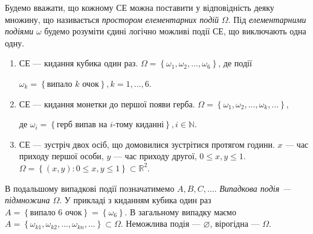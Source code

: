 Будемо вважати, що кожному СЕ можна поставити у відповідність деяку множину, що
називається \emph{простором елементарних подій} $\Omega$. 
Під \emph{елементарними подіями} $\omega$ будемо розуміти єдині
логічно можливі події СЕ, що виключають одна одну.
\begin{example}
    \begin{enumerate}
        \item СЕ --- кидання кубика один раз. 
        $\Omega = \left\{\omega_1, \omega_2, ..., \omega_6\right\}$, 
        де події 

        $\omega_k = \left\{\text{випало } k \text{ очок}\right\}, k = 1,...,6$.
        \item СЕ --- кидання монетки до першої появи герба.
        $\Omega = \left\{\omega_1, \omega_2, ..., \omega_k, ...\right\}$, 
        
        де $\omega_i = \left\{\text{герб випав на }i\text{-тому киданні}\right\}, i\in \mathbb{N}$.
        \item СЕ --- зустріч двох осіб, що домовилися зустрітися протягом години.
        $x$ --- час приходу першої особи, $y$ --- час приходу другої, $0\leq x, y \leq 1$.
        $\Omega = \left\{ \left( x, y\right): 0\leq x, y \leq 1\right\}\subset \mathbb{R}^2$.
    \end{enumerate}
\end{example}
В подальшому випадкові події позначатимемо $A, B, C, ...$. 
\emph{Випадкова подія --- підмножина $\Omega$}. 
У прикладі з киданням кубика один раз $A = \left\{\text{випало }6\text{ очок}\right\} = \left\{ \omega_6\right\}$.
В загальному випадку маємо $A = \left\{\omega_{k1}, \omega_{k2}, ..., \omega_{kn}, ...\right\} \subset \Omega$.
Неможлива подія --- $\varnothing$, вірогідна --- $\Omega$. 

